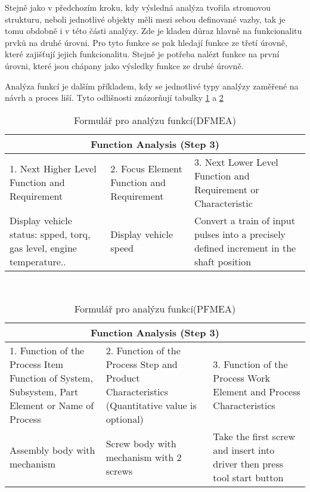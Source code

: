 Stejně jako v předchozím kroku, kdy výsledná analýza tvořila stromovou strukturu, neboli jednotlivé objekty měli mezi sebou definované vazby, tak je tomu obdobně i v této části analýzy. Zde je kladen důraz hlavně na funkcionalitu prvků na druhé úrovni. Pro tyto funkce se pak hledají funkce ze třetí úrovně, které zajišťují jejich funkcionalitu. Stejně je potřeba nalézt funkce na první úrovni, které jsou chápany jako výsledky funkce ze druhé úrovně. 

Analýza funkcí je dalším příkladem, kdy se jednotlivé typy analýzy zaměřené na návrh a proces liší. Tyto odlišnosti znázorňují tabulky \ref{tab:function_DFMEA} a \ref{tab:function_PFMEA} 

\begin{center}
\begin{table}[h]
	\centering
	\caption{Formulář pro analýzu funkcí(DFMEA) }
	\label{tab:function_DFMEA}
\begin{tabular}{ |p{5cm}|p{4cm}|p{4cm}|  }
 \hline
 \multicolumn{3}{|c|}{Function Analysis (Step 3)} \\
 \hline
 1. Next Higher Level Function and Requirement &
2. Focus Element
Function and Requirement &
3. Next Lower Level Function and Requirement or Characteristic\\
 \hline
 Display vehicle status: spped, torq, gas level, engine temperature..   & Display vehicle speed    & Convert a train of input pulses into a precisely defined increment in the shaft position\\


 \hline
\end{tabular}\  
\end{table}
\end{center}

\begin{center}
\begin{table}[h]
	\centering
	\caption{Formulář pro analýzu funkcí(PFMEA) }
	\label{tab:function_PFMEA}
\begin{tabular}{ |p{5cm}|p{4cm}|p{4cm}|  }
 \hline
 \multicolumn{3}{|c|}{Function Analysis (Step 3)} \\
 \hline
1. Function of the Process Item
Function of System, Subsystem, Part Element or Name of Process
& 2. Function of the Process Step and Product Characteristics
(Quantitative value is optional)
& 3. Function of the Process Work Element and Process Characteristics
\\
 \hline
Assembly body with mechanism   & Screw body with mechanism with 2 screws   &Take the first screw and insert into driver then press tool start button\\


 \hline
\end{tabular}\  
\end{table}
\end{center}

